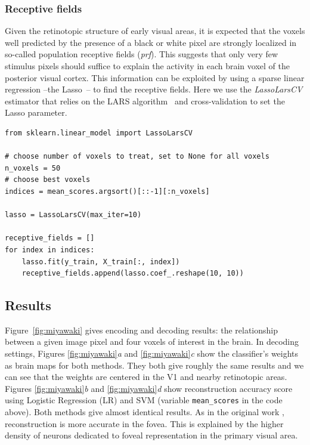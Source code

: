 \documentclass{frontiersSCNS} %
\begin{document}
\subsubsection{Receptive fields}
Given the retinotopic structure of early visual areas, it is expected
that the voxels well predicted by the presence of a black or white pixel
are strongly localized in so-called population
receptive fields (\textit{prf}). This suggests that only very few
stimulus pixels should suffice to explain the activity in each brain
voxel of the posterior visual cortex.
%
This information can be exploited by using a sparse linear
regression --the Lasso~\citep{tibshirani:96}-- to find the receptive fields.
Here we use the \emph{LassoLarsCV} estimator that relies on the LARS
algorithm~\citep{Efron04leastangle} and
cross-validation to set the Lasso parameter.

\begin{lstlisting}
from sklearn.linear_model import LassoLarsCV

# choose number of voxels to treat, set to None for all voxels
n_voxels = 50
# choose best voxels
indices = mean_scores.argsort()[::-1][:n_voxels]

lasso = LassoLarsCV(max_iter=10)

receptive_fields = []
for index in indices:
    lasso.fit(y_train, X_train[:, index])
    receptive_fields.append(lasso.coef_.reshape(10, 10))

\end{lstlisting}

\subsection{Results}

\label{sec:miyawaki_results}
Figure~\ref{fig:miyawaki} gives encoding and decoding results: the relationship
between a given image pixel and four voxels of interest in the brain.
In decoding settings, Figures \ref{fig:miyawaki}\textit{a} and \ref{fig:miyawaki}\textit{c} show the classifier's weights as brain
maps for both methods. They both give roughly the same results and we can
see that the weights are centered in the V1 and nearby retinotopic areas.
Figures \ref{fig:miyawaki}\textit{b} and \ref{fig:miyawaki}\textit{d} show reconstruction
accuracy score using Logistic Regression (LR) and SVM
(variable \texttt{mean\_scores} in the code above).
Both methods give almost identical results. 
As in the original work \citep{miyawaki2008}, reconstruction is more
accurate in the fovea.
This is explained by the higher density of neurons dedicated to
foveal representation in the primary visual area.
\end{document}
